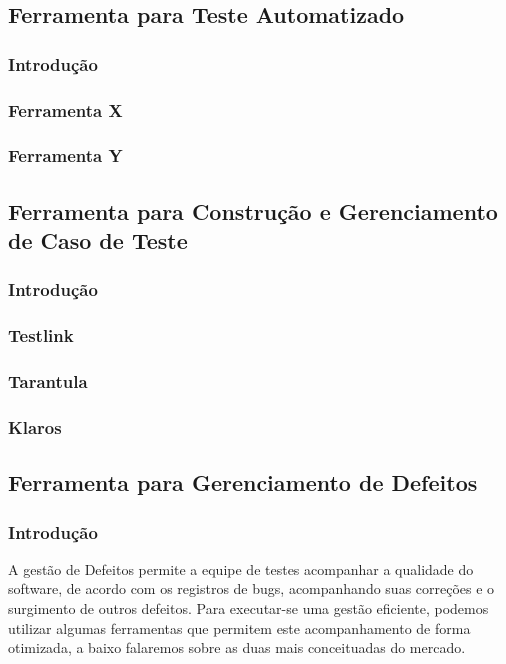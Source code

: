 \documentclass[12pt,a4paper]{article}
\begin{document}
	\subsection{Ferramenta para Teste Automatizado}
		\subsubsection{Introdução}
		\subsubsection{Ferramenta X}
		\subsubsection{Ferramenta Y}
		
	\subsection{Ferramenta para Construção e Gerenciamento de Caso de Teste}
		\subsubsection{Introdução}
		\subsubsection{Testlink}
		\subsubsection{Tarantula}
		\subsubsection{Klaros}
		
	\subsection{Ferramenta para Gerenciamento de Defeitos}
		\subsubsection{Introdução}
		
			A gestão de Defeitos permite a equipe de testes acompanhar a qualidade do software, 
			de acordo com os registros de bugs, acompanhando suas correções e o surgimento de outros defeitos. 
			Para executar-se uma gestão eficiente, podemos utilizar algumas ferramentas que permitem este acompanhamento de forma otimizada, 
			a baixo falaremos sobre as duas mais conceituadas do mercado.
			
\end{document}
